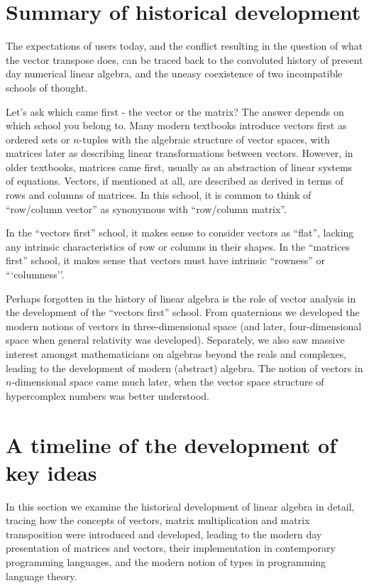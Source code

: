 \section{Summary of historical development}

The expectations of users today, and the conflict resulting in the question
of what the vector transpose does, can be traced back to the convoluted history
of present day numerical linear algebra, and the uneasy coexistence of two
incompatible schools of thought.

Let's ask which came first - the vector or the matrix? The answer depends on
which school you belong to. Many modern textbooks  introduce
vectors first as ordered sets or $n$-tuples with the algebraic structure of
vector spaces, with matrices later as describing linear transformations between
vectors.
However, in older textbooks, matrices came first, usually as an abstraction of
linear systems of equations. Vectors, if mentioned at all, are described as
derived in terms of rows and columns of matrices. In this school, it is common
to think of ``row/column vector'' as synonymous with ``row/column matrix''.

In the ``vectors first'' school, it makes sense to consider vectors as ``flat'',
lacking any intrinsic characteristics of row or columns in their shapes.
In the ``matrices first'' school, it makes sense that vectors must have intrinsic
``rowness'' or ```columness''.

Perhaps forgotten in the history of linear algebra is the role of vector analysis
in the development of the ``vectors first'' school. From quaternions we developed
the modern notions of vectors in three-dimensional space (and later, four-dimensional
space when general relativity was developed). Separately, we also saw massive
interest amongst mathematicians on algebras beyond the reals and complexes,
leading to the development of modern (abstract) algebra. The notion of vectors
in $n$-dimensional space came much later, when the vector space structure of
hypercomplex numbers was better understood.



\section{A timeline of the development of key ideas}

In this section we examine the historical development of linear algebra in
detail, tracing how the concepts of vectors, matrix multiplication and
matrix transposition were introduced and developed, leading to the modern day
presentation of matrices and vectors, their implementation in contemporary
programming languages, and the modern notion of types in programming language
theory.

